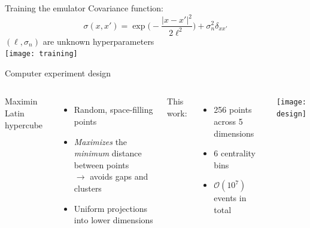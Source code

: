 \documentclass{beamer}
\newcommand{\order}[1]{$\mathcal O(10^{#1})$}
\begin{document}
\begin{frame}{Training the emulator}
  Covariance function:
  \begin{equation*}
    \sigma(x, x') = \exp\biggl( -\frac{|x - x'|^2}{2\ell^2} \biggr) +
                    \sigma_n^2\delta_{xx'}
  \end{equation*}
  $(\ell, \sigma_n)$ are unknown hyperparameters \\
  \bigskip
  \centering
  \texttt{[image: training]}
\end{frame}


\begin{frame}{Computer experiment design}
  \begin{columns}
    Maximin Latin hypercube
    \begin{itemize}
      \item Random, space-filling points
      \item \emph{Maximizes} the \emph{minimum} distance between points \\
        $\rightarrow$ avoids gaps and clusters
      \item Uniform projections into lower dimensions
    \end{itemize}
    \smallskip
    This work:
    \begin{itemize}
      \item 256 points across 5 dimensions
      \item 6 centrality bins
      \item \order 7 events in total
    \end{itemize}

    \texttt{[image: design]}
  \end{columns}
\end{frame}
\end{document}
